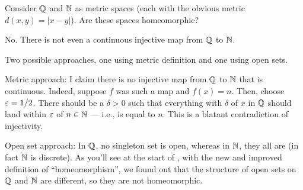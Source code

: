 \begin{problem}
  Consider $\mathbb Q$ and $\mathbb N$ as metric spaces (each with the obvious metric $d(x,y) = |x-y|$).
  Are these spaces homeomorphic?
	\begin{hint}
		No. There is not even a continuous injective map from $\mathbb Q$ to $\mathbb N$.
	\end{hint}
	\begin{sol}
		Two possible approaches, one using metric definition
		and one using open sets.

		Metric approach: I claim there is no injective map from $\mathbb Q$ to $\mathbb N$
		that is continuous. Indeed, suppose $f$ was such a map and $f(x) = n$.
		Then, choose $\varepsilon = 1/2$.
		There should be a $\delta > 0$ such that everything with $\delta$ of $x$
		in $\mathbb Q$ should land within $\varepsilon$ of $n \in \mathbb N$ --- i.e., is equal to $n$.
		This is a blatant contradiction of injectivity.

		Open set approach: In $\mathbb Q$, no singleton set is open,
		whereas in $\mathbb N$, they all are (in fact $\mathbb N$ is discrete).
		As you'll see at the start of ,
		with the new and improved definition of ``homeomorphism'',
		we found out that the structure of open sets on $\mathbb Q$ and $\mathbb N$ are different,
		so they are not homeomorphic.
	\end{sol}
\end{problem}

